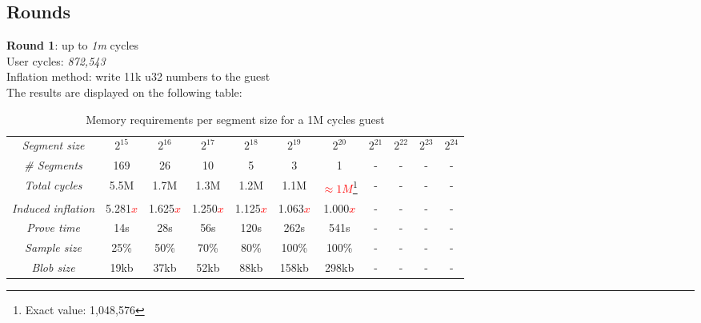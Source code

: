 \documentclass[a4paper, 10pt]{article}
\begin{document}
\subsection*{Rounds} 
\par \noindent
\textbf{Round 1}: up to \textit{1m} cycles\\
User cycles: \textit{872,543}\\
Inflation method: write 11k u32 numbers to the guest\\
The results are displayed on the following table:
\begin{table}[H]
  	\begin{center}
    \label{tab:table2}
    \begin{minipage}{\textwidth}
    \begin{adjustbox}{width=\textwidth}
    \begin{tabular}{c|c|c|c|c|c|c|c|c|c|c}
	  \textit{Segment size} & $2^{15}$ & $2^{16}$ & $2^{17}$ & $2^{18}$ & $2^{19}$ & $2^{20}$ & $2^{21}$ & $2^{22}$ & $2^{23}$ & $2^{24}$\\
	  \textit{\# Segments} & 169 & 26 & 10 & 5 & 3 & 1 & - & - & - & -\\
	  \textit{Total cycles} & 5.5M & 1.7M & 1.3M & 1.2M & 1.1M & \textcolor{red}{$\approx 1M$}\footnote{Exact value: 1,048,576}  & - & - & - & -\\
	  \textit{Induced inflation} & 5.281\textcolor{red}{$x$} & 1.625\textcolor{red}{$x$} & 1.250\textcolor{red}{$x$} & 1.125\textcolor{red}{$x$} & 1.063\textcolor{red}{$x$} & 1.000\textcolor{red}{$x$} & - & - & - & -\\
	  \textit{Prove time} & 14s & 28s & 56s & 120s & 262s & 541s & - & - & - & -\\
	  \textit{Sample size} & 25\% & 50\% & 70\% & 80\% & 100\% & 100\% & - & - & - & -\\
	  \textit{Blob size} & 19kb & 37kb & 52kb & 88kb &158kb & 298kb & - & - & - & -\\
   	\end{tabular}
   	\end{adjustbox}
   	\end{minipage}
    \caption{Memory requirements per segment size for a 1M cycles guest}
  \end{center}
\end{table}
\end{document}
